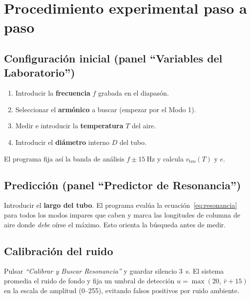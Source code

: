 \documentclass[11pt,a4paper]{article}
\newcommand{\vteo}{v_{\text{teo}}}
\begin{document}
\section{Procedimiento experimental paso a paso}

\subsection{Configuración inicial (panel ``Variables del Laboratorio'')}
\begin{enumerate}[nosep]
  \item Introducir la \textbf{frecuencia} $f$ grabada en el diapasón.
  \item Seleccionar el \textbf{armónico} a buscar (empezar por el Modo 1).
  \item Medir e introducir la \textbf{temperatura} $T$ del aire.
  \item Introducir el \textbf{diámetro} interno $D$ del tubo.
\end{enumerate}
El programa fija así la banda de análisis $f\pm\SI{15}{\hertz}$ y calcula $\vteo(T)$ y $e$.

\subsection{Predicción (panel ``Predictor de Resonancia'')}
Introducir el \textbf{largo del tubo}. El programa evalúa la
ecuación~\eqref{eq:resonancia} para todos los modos impares que caben y marca las longitudes
de columna de aire donde \emph{debe} oírse el máximo. Esto orienta la búsqueda antes de medir.

\subsection{Calibración del ruido}
Pulsar \emph{``Calibrar y Buscar Resonancia''} y guardar silencio \SI{3}{\second}. El sistema
promedia el ruido de fondo y fija un umbral de detección $u=\max(20,\ \bar{r}+15)$ en la escala
de amplitud (0--255), evitando falsos positivos por ruido ambiente.
\end{document}
